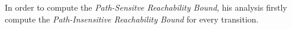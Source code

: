 In order to compute the \emph{Path-Sensitve Reachability Bound}, his analysis firstly compute the \emph{Path-Insensitive Reachability Bound} for every transition.
\\
